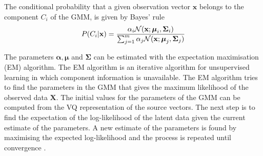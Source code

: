 The conditional probability that a given observation vector $\mathbf{x}$ belongs to the component $C_i$ of the GMM, is given by Bayes' rule \cite{statistikk}
\begin{equation}
	\label{eq:bayes}
	P(C_i\vert \mathbf{x}) = \frac{\alpha_i \mathcal N(\mathbf{x}; \boldsymbol{\mu}_i, \mathbf{\Sigma}_i)}{\sum_{j=1}^{m}\alpha_j \mathcal N(\mathbf{x}; \boldsymbol{\mu}_j, \mathbf{\Sigma}_j)}
\end{equation}

The parameters $\boldsymbol{\alpha}, \boldsymbol{\mu}$ and $ \mathbf{\Sigma}$ can be estimated with the expectation maximisation (EM) algorithm. The EM algorithm is an iterative algorithm for unsupervised learning in which component information is unavailable. The EM algorithm tries to find the parameters in the GMM that gives the maximum likelihood of the observed data $\mathbf{X}$. The initial values for the parameters of the GMM can be computed from the VQ representation of the source vectors. The next step is to find the expectation of the log-likelihood of the latent data given the current estimate of the parameters. A new estimate of the parameters is found by maximising the expected log-likelihood and the process is repeated until convergence \cite{taletek}.



